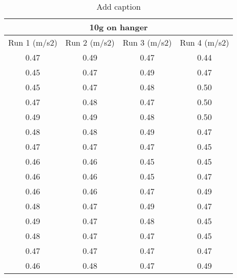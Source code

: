 
\begin{table}[htbp]
  \centering
  \caption{Add caption}
    \begin{tabular}{|c|c|c|c|}
    \toprule
    \multicolumn{4}{|c|}{10g on hanger} \\
    \midrule
    Run 1 (m/s2) & Run 2 (m/s2) & Run 3 (m/s2) & Run 4 (m/s2) \\
    \midrule
    0.47  & 0.49  & 0.47  & 0.44 \\
    \midrule
    0.45  & 0.47  & 0.49  & 0.47 \\
    \midrule
    0.45  & 0.47  & 0.48  & 0.50 \\
    \midrule
    0.47  & 0.48  & 0.47  & 0.50 \\
    \midrule
    0.49  & 0.49  & 0.48  & 0.50 \\
    \midrule
    0.48  & 0.48  & 0.49  & 0.47 \\
    \midrule
    0.47  & 0.47  & 0.47  & 0.45 \\
    \midrule
    0.46  & 0.46  & 0.45  & 0.45 \\
    \midrule
    0.46  & 0.46  & 0.45  & 0.47 \\
    \midrule
    0.46  & 0.46  & 0.47  & 0.49 \\
    \midrule
    0.48  & 0.47  & 0.49  & 0.47 \\
    \midrule
    0.49  & 0.47  & 0.48  & 0.45 \\
    \midrule
    0.48  & 0.47  & 0.47  & 0.45 \\
    \midrule
    0.47  & 0.47  & 0.47  & 0.47 \\
    \midrule
    0.46  & 0.48  & 0.47  & 0.49 \\
    \bottomrule
    \end{tabular}%
  \label{tab:addlabel}%
\end{table}%
